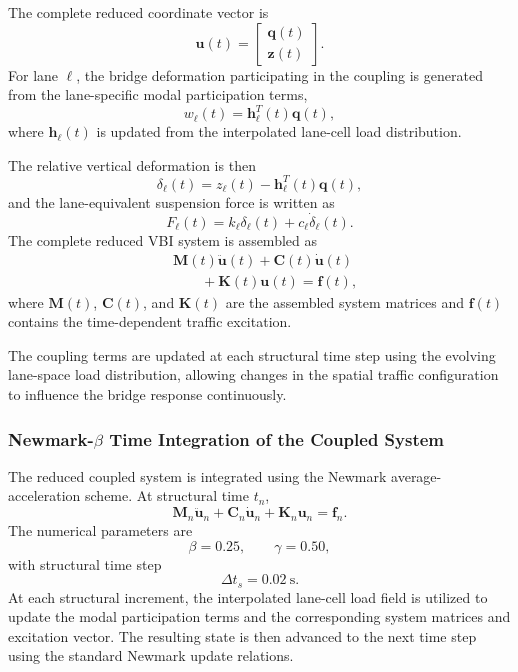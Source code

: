 \documentclass[journal]{IEEEtran}
\begin{document}
The complete reduced coordinate vector is
\begin{equation}
\mathbf{u}(t)=\begin{bmatrix}\mathbf{q}(t)\\\mathbf{z}(t)\end{bmatrix}.
\end{equation}
For lane $\ell$, the bridge deformation participating in the coupling is generated from the lane-specific modal participation terms,
\begin{equation}
w_{\ell}(t)=\mathbf{h}_{\ell}^{T}(t)\mathbf{q}(t),
\end{equation}
where $\mathbf{h}_{\ell}(t)$ is updated from the interpolated lane-cell load distribution.

The relative vertical deformation is then
\begin{equation}
\delta_{\ell}(t)=z_{\ell}(t)-\mathbf{h}_{\ell}^{T}(t)\mathbf{q}(t),
\end{equation}
and the lane-equivalent suspension force is written as
\begin{equation}
F_{\ell}(t)=k_{\ell}\delta_{\ell}(t)+c_{\ell}\dot{\delta}_{\ell}(t).
\end{equation}
The complete reduced VBI system is assembled as
\begin{equation}
\begin{aligned}
&\mathbf{M}(t)\ddot{\mathbf{u}}(t)+\mathbf{C}(t)\dot{\mathbf{u}}(t)\\
&\qquad+\mathbf{K}(t)\mathbf{u}(t)=\mathbf{f}(t),
\end{aligned}
\end{equation}
where $\mathbf{M}(t)$, $\mathbf{C}(t)$, and $\mathbf{K}(t)$ are the assembled system matrices and $\mathbf{f}(t)$ contains the time-dependent traffic excitation.

The coupling terms are updated at each structural time step using the evolving lane-space load distribution, allowing changes in the spatial traffic configuration to influence the bridge response continuously.

\subsubsection{Newmark-$\beta$ Time Integration of the Coupled System}

The reduced coupled system is integrated using the Newmark average-acceleration scheme. At structural time $t_n$,
\begin{equation}
\mathbf{M}_n\ddot{\mathbf{u}}_n+\mathbf{C}_n\dot{\mathbf{u}}_n+\mathbf{K}_n\mathbf{u}_n=\mathbf{f}_n.
\end{equation}
The numerical parameters are
\begin{equation}
\beta=0.25,\qquad\gamma=0.50,
\end{equation}
with structural time step
\begin{equation}
\Delta t_s=0.02~\mathrm{s}.
\end{equation}
At each structural increment, the interpolated lane-cell load field is utilized to update the modal participation terms and the corresponding system matrices and excitation vector. The resulting state is then advanced to the next time step using the standard Newmark update relations.
\end{document}
